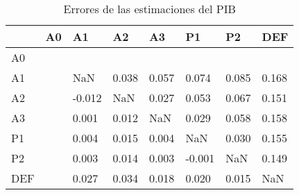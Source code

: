\begin{table}[htbp]
\centering
\caption{Errores de las estimaciones del PIB}
\label{tab:errores_pib}
\begin{tabular}{llllllll}
\toprule
{} & A0 &      A1 &     A2 &     A3 &      P1 &     P2 &    DEF \\
\midrule
A0  &    &         &        &        &         &        &        \\
A1  &    &     NaN &  0.038 &  0.057 &   0.074 &  0.085 &  0.168 \\
A2  &    &  -0.012 &    NaN &  0.027 &   0.053 &  0.067 &  0.151 \\
A3  &    &   0.001 &  0.012 &    NaN &   0.029 &  0.058 &  0.158 \\
P1  &    &   0.004 &  0.015 &  0.004 &     NaN &  0.030 &  0.155 \\
P2  &    &   0.003 &  0.014 &  0.003 &  -0.001 &    NaN &  0.149 \\
DEF &    &   0.027 &  0.034 &  0.018 &   0.020 &  0.015 &    NaN \\
\bottomrule
\end{tabular}
\end{table}
